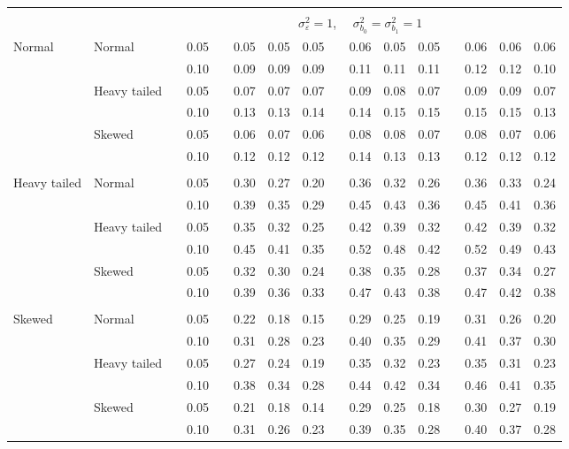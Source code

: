 \documentclass{article} %
\begin{document}
\begin{table}[ht]
\begin{scriptsize}
\begin{center}
\begin{tabular}{ll p{.1cm} c p{.1cm} rrr p{.1cm} rrr p{.1cm} rrr}
&&&&&&&&&&&&&&&\\
& && && \multicolumn{9}{c}{$\sigma_{\varepsilon}^2 = 1$, \ \ $\sigma_{b_0}^2 = \sigma_{b_1}^2 = 1$} \\ \cline{6-16}
\rowcolor{gray!20}Normal       & Normal       && 0.05 &&   0.05 & 0.05 & 0.05 && 0.06 & 0.05 & 0.05 &&  0.06 & 0.06 & 0.06 \\
\rowcolor{gray!20}             &              && 0.10 &&   0.09 & 0.09 & 0.09 && 0.11 & 0.11 & 0.11 &&  0.12 & 0.12 & 0.10 \\
\rowcolor{gray!20}             & Heavy tailed && 0.05 &&   0.07 & 0.07 & 0.07 && 0.09 & 0.08 & 0.07 &&  0.09 & 0.09 & 0.07 \\
\rowcolor{gray!20}             &              && 0.10 &&   0.13 & 0.13 & 0.14 && 0.14 & 0.15 & 0.15 &&  0.15 & 0.15 & 0.13 \\
\rowcolor{gray!20}             & Skewed       && 0.05 &&   0.06 & 0.07 & 0.06 && 0.08 & 0.08 & 0.07 &&  0.08 & 0.07 & 0.06 \\
\rowcolor{gray!20}             &              && 0.10 &&   0.12 & 0.12 & 0.12 && 0.14 & 0.13 & 0.13 &&  0.12 & 0.12 & 0.12 \\
             &&&&&&&&&&&&&&&\\
Heavy tailed & Normal       && 0.05 &&   0.30 & 0.27 & 0.20 && 0.36 & 0.32 & 0.26 && 0.36 & 0.33 & 0.24 \\ 
             &              && 0.10 &&   0.39 & 0.35 & 0.29 && 0.45 & 0.43 & 0.36 && 0.45 & 0.41 & 0.36 \\ 
             & Heavy tailed && 0.05 &&   0.35 & 0.32 & 0.25 && 0.42 & 0.39 & 0.32 && 0.42 & 0.39 & 0.32 \\ 
             &              && 0.10 &&   0.45 & 0.41 & 0.35 && 0.52 & 0.48 & 0.42 && 0.52 & 0.49 & 0.43 \\ 
             & Skewed       && 0.05 &&   0.32 & 0.30 & 0.24 && 0.38 & 0.35 & 0.28 && 0.37 & 0.34 & 0.27 \\ 
             &              && 0.10 &&   0.39 & 0.36 & 0.33 && 0.47 & 0.43 & 0.38 && 0.47 & 0.42 & 0.38 \\ 
             &&&&&&&&&&&&&&&\\
Skewed       & Normal       && 0.05 &&   0.22 & 0.18 & 0.15 && 0.29 & 0.25 & 0.19 && 0.31 & 0.26 & 0.20 \\ 
             &              && 0.10 &&   0.31 & 0.28 & 0.23 && 0.40 & 0.35 & 0.29 && 0.41 & 0.37 & 0.30 \\ 
             & Heavy tailed && 0.05 &&   0.27 & 0.24 & 0.19 && 0.35 & 0.32 & 0.23 && 0.35 & 0.31 & 0.23 \\ 
             &              && 0.10 &&   0.38 & 0.34 & 0.28 && 0.44 & 0.42 & 0.34 && 0.46 & 0.41 & 0.35 \\ 
             & Skewed       && 0.05 &&   0.21 & 0.18 & 0.14 && 0.29 & 0.25 & 0.18 && 0.30 & 0.27 & 0.19 \\ 
             &              && 0.10 &&   0.31 & 0.26 & 0.23 && 0.39 & 0.35 & 0.28 && 0.40 & 0.37 & 0.28 \\ 



\end{tabular}
\end{center}
\end{scriptsize}
\end{table}
\end{document}
